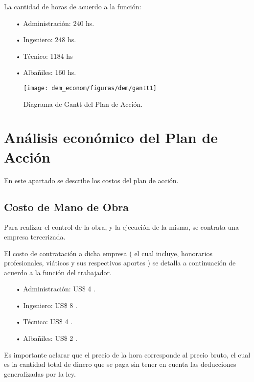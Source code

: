 La cantidad de horas de acuerdo a la función:



\begin{itemize}


\item[•] Administración: 240 hs.
\item[•] Ingeniero: 248 hs.
\item[•]Técnico: 1184 hs
\item[•]Albañiles: 160 hs.

\end{itemize}

\begin{figure}[H]
	\centering
	\texttt{[image: dem\_econom/figuras/dem/gantt1]}
	\caption{Diagrama de Gantt del Plan de Acción.}
	\label{dem-figuras:gantt1}
\end{figure}





\section{Análisis económico del Plan de Acción}
 En este apartado se describe los costos del plan de acción.
\subsection{Costo de Mano de Obra}
Para realizar el control de la obra, y la ejecución de la misma, se contrata una empresa tercerizada.

El costo de contratación a dicha empresa ( el cual incluye, honorarios profesionales, viáticos y sus respectivos aportes )  se detalla a continuación de acuerdo a la función del trabajador.

\begin{itemize}


\item[•] Administración: US\$ 4 \cite{costo4}.
\item[•] Ingeniero: US\$ 8 \cite{costo1}.
\item[•]Técnico: US\$ 4 \cite{costo3}.
\item[•]Albañiles: US\$ 2 \cite{costo2}.

\end{itemize}

Es importante aclarar que el precio de la hora corresponde al precio bruto, el cual es la cantidad total de dinero que se paga sin tener en cuenta las deducciones generalizadas por la ley.

